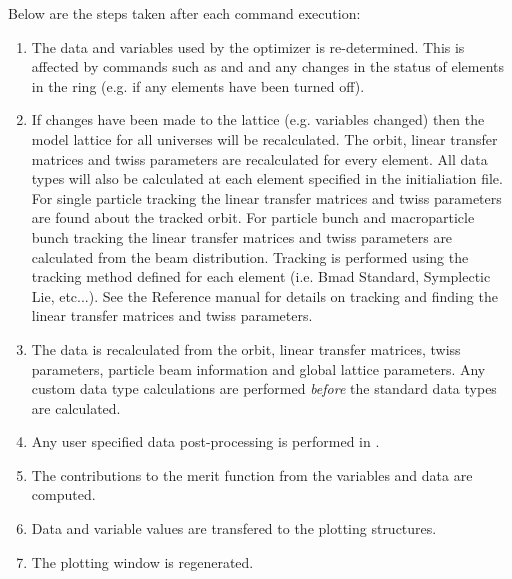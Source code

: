 Below are the steps taken after each \tao command execution:
\begin{enumerate}
  \item 
The data and variables used by the optimizer is re-determined. This is
affected by commands such as  and  and any
changes in the status of elements in the ring (e.g. if any elements
have been turned off).
  \item 
If changes have been made to the lattice (e.g. variables changed) then the model
lattice for all universes will be recalculated. The  orbit, linear
transfer matrices and twiss parameters are recalculated for every element. All
data types will also be calculated at each element specified in the
initialiation file.  For single particle tracking the linear transfer matrices
and twiss parameters are found about the tracked orbit. For particle bunch and
macroparticle bunch tracking the linear transfer matrices and twiss parameters
are calculated from the beam distribution.  Tracking is performed using the
tracking method defined for each element (i.e. Bmad Standard, Symplectic Lie,
etc...). See the \bmad Reference manual for details on tracking and finding the
linear transfer matrices and twiss parameters.
  \item 
The  data is recalculated from the  orbit, linear transfer
matrices, twiss parameters, particle beam information and global lattice
parameters.  Any custom  data type calculations are performed \textit{before}
the standard \tao data types are calculated.
  \item 
Any user specified data post-processing is performed in
.
  \item 
The contributions to the merit function from the variables and data are
computed.
  \item 
Data and variable values are transfered to the plotting structures.
  \item 
The plotting window is regenerated.
\end{enumerate}

